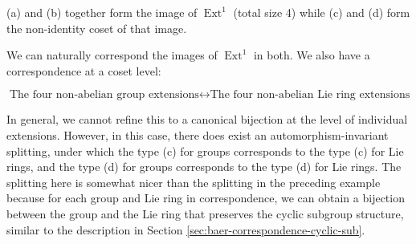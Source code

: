 (a) and (b) together form the image of $\operatorname{Ext}^1$ (total
size 4) while (c) and (d) form the non-identity coset of that
image.

We can naturally correspond the images of $\operatorname{Ext}^1$ in
both. We also have a correspondence at a coset level:

$$\text{The four non-abelian group extensions} \leftrightarrow \text{The four non-abelian Lie ring extensions}$$

In general, we cannot refine this to a canonical bijection at the
level of individual extensions. However, in this case, there does
exist an automorphism-invariant splitting, under which the type (c)
for groups corresponds to the type (c) for Lie rings, and the type (d)
for groups corresponds to the type (d) for Lie rings. The splitting
here is somewhat nicer than the splitting in the preceding example
because for each group and Lie ring in correspondence, we can obtain a
bijection between the group and the Lie ring that preserves the cyclic
subgroup structure, similar to the description in Section
\ref{sec:baer-correspondence-cyclic-sub}.



